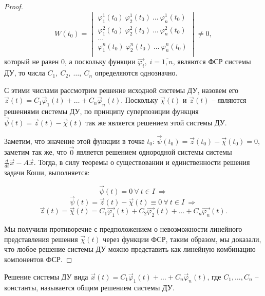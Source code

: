 \begin{proof}
    \begin{equation}
        W(t_0) = 
        \begin{vmatrix}
        \varphi_1^1(t_0) ~ \varphi_2^1(t_0) ~ \dots ~ \varphi_n^1(t_0) \\
        \varphi_1^2(t_0) ~ \varphi_2^2(t_0) ~ \dots ~ \varphi_n^2(t_0) \\
        \dots \\
        \varphi_1^n(t_0) ~ \varphi_2^n(t_0) ~ \dots ~ \varphi_n^n(t_0) \\
        \end{vmatrix} \neq 0,
    \end{equation}
    который не равен $0$, а поскольку функции $\overrightarrow{\varphi_i},\; i = \overline{1, n}$, являются ФСР системы ДУ, то числа $C_1, ~ C_2, ~ \dots, ~ C_n$ определяются однозначно.
    
    С этими числами рассмотрим решение исходной системы ДУ, назовем его $\overrightarrow{z}(t) = C_1 \overrightarrow \varphi_1(t) + \dots + C_n \overrightarrow \varphi_n(t)$. Поскольку $\overrightarrow{\chi}(t)$ и $\overrightarrow{z}(t)$ -- являются решениями системы ДУ, по принципу суперпозиции функция $\overrightarrow{\psi}(t) = \overrightarrow{z}(t) - \overrightarrow{\chi}(t)$ так же является решением этой системы ДУ.
    
    Заметим, что значение этой функции в точке $t_0$: $\overrightarrow{\psi}(t_0) = \overrightarrow{z}(t_0) - \overrightarrow{\chi}(t_0) = 0$, заметим так же, что $\overrightarrow{0}$ является решением однородной системы системы $\frac{d}{dt} \overrightarrow{x} - A \overrightarrow{x}$. Тогда, в силу теоремы о существовании и единственности решения задачи Коши, выполняется:
    
    \[ \overrightarrow{\psi}(t) = 0 ~ \forall ~ t \in I ~ \Rightarrow \]
    \[ \overrightarrow{\psi}(t) = \overrightarrow{z}(t) - \overrightarrow{\chi}(t) \equiv 0 ~ \forall ~ t \in I ~ \Rightarrow \]
    \[ \overrightarrow{z}(t) = \overrightarrow{\chi}(t) = C_1 \overrightarrow{\varphi_1}(t) + C_2 \overrightarrow{\varphi_2}(t) + \dots + C_n \overrightarrow{\varphi_n}(t).\]
    
    Мы получили противоречие с предположением о невозможности линейного представления решения $\overrightarrow{\chi}(t)$ через функции ФСР, таким образом, мы доказали, что любое решение системы ДУ можно представить как линейную комбинацию компонентов ФСР.
\end{proof}

\begin{definition}
    Решение системы ДУ вида $\overrightarrow x(t) = C_1 \overrightarrow \varphi_1(t) + \dots + C_n \overrightarrow \varphi_n(t)$, где $C_1, \dots, C_n$ -- константы,
    называется общим решением системы ДУ.
\end{definition}


